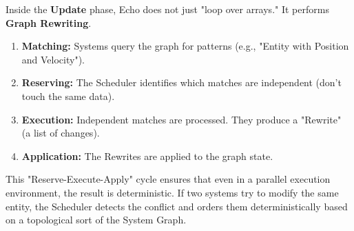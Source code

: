 Inside the \textbf{Update} phase, Echo does not just "loop over arrays." It performs \textbf{Graph Rewriting}.

\begin{enumerate}
    \item \textbf{Matching:} Systems query the graph for patterns (e.g., "Entity with Position and Velocity").
    \item \textbf{Reserving:} The Scheduler identifies which matches are independent (don't touch the same data).
    \item \textbf{Execution:} Independent matches are processed. They produce a "Rewrite" (a list of changes).
    \item \textbf{Application:} The Rewrites are applied to the graph state.
\end{enumerate}

This "Reserve-Execute-Apply" cycle ensures that even in a parallel execution environment, the result is deterministic. If two systems try to modify the same entity, the Scheduler detects the conflict and orders them deterministically based on a topological sort of the System Graph.
